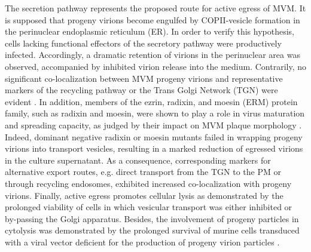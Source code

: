 The secretion pathway represents the proposed route for active egress of MVM. It is supposed that progeny virions become engulfed by COPII-vesicle formation in the perinuclear endoplasmic reticulum (ER). In order to verify this hypothesis, cells lacking functional effectors of the secretory pathway were productively infected.  Accordingly, a dramatic retention of virions in the perinuclear area was observed, accompanied by inhibited virion release into the medium. Contrarily, no significant co-localization between MVM progeny virions and representative markers of the recycling pathway or the Trans Golgi Network (TGN) were evident \cite{pmid24068925}. In addition, members of the ezrin, radixin, and moesin (ERM) protein family, such as radixin and moesin, were shown to play a role in virus maturation and spreading capacity, as judged by their impact on MVM plaque morphology \cite{pmid19321616}. Indeed, dominant negative radixin or moesin mutants failed in wrapping progeny virions into transport vesicles, resulting in a marked reduction of egressed virions in the culture supernatant. As a consequence, corresponding markers for alternative export routes, e.g. direct transport from the TGN to the PM or through recycling endosomes, exhibited increased co-localization with progeny virions. Finally, active egress promotes cellular lysis as demonstrated by the prolonged viability of cells in which vesicular transport was either inhibited or by-passing the Golgi apparatus. Besides, the involvement of progeny particles in cytolysis was demonstrated by the prolonged survival of murine cells transduced with a viral vector deficient for the production of progeny virion particles \cite{pmid24068925}.  




